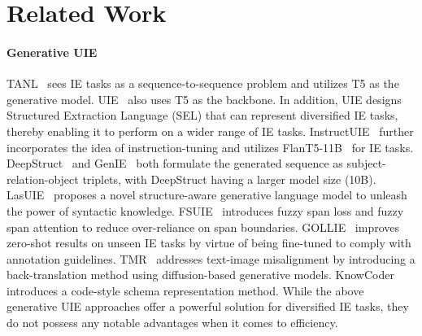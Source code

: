 \section{Related Work}
\label{related-work}

\paragraph{Generative UIE} TANL~\citep{tanl} sees IE tasks as a sequence-to-sequence problem and utilizes T5 as the generative model. UIE~\citep{uie} also uses T5 as the backbone. In addition, UIE designs Structured Extraction Language (SEL) that can represent diversified IE tasks, thereby enabling it to perform on a wider range of IE tasks.
InstructUIE~\citep{instructuie} further incorporates the idea of instruction-tuning and utilizes FlanT5-11B~\citep{flan-t5} for IE tasks. DeepStruct~\citep{deepstruct} and GenIE~\citep{genie} both formulate the generated sequence as subject-relation-object triplets, with DeepStruct having a larger model size (10B). LasUIE~\citep{lasuie} proposes a novel structure-aware generative language model to unleash the power of syntactic knowledge. FSUIE~\citep{fsuie} introduces fuzzy span loss and fuzzy span attention to reduce over-reliance on span boundaries. 
GOLLIE~\citep{gollie} improves zero-shot results on unseen IE tasks by virtue of being fine-tuned to comply with annotation
guidelines.
TMR~\citep{tmr} addresses text-image misalignment by introducing a back-translation method using diffusion-based generative models. KnowCoder~\citep{knowcoder}  introduces a
code-style schema representation method. While the above generative UIE approaches offer a powerful solution for diversified IE tasks, they do not possess any notable advantages when it comes to efficiency. 
